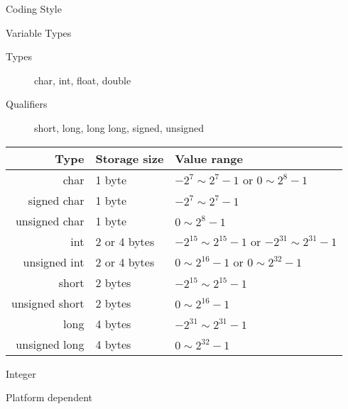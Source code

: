 \begin{frame}{Coding Style}
\begin{center}
\end{center}
\end{frame}

\begin{frame}{Variable Types}
  \begin{description}
  \item[Types] char, int, float, double
  \item[Qualifiers] short, long, long long, signed, unsigned
  \end{description}
  \begin{center}{\small
    \begin{tabular}{r|l|l}
      \textbf{Type} & \textbf{Storage size} & \textbf{Value range}\\\hline
      char          & 1 byte        & ${-2^7} \sim {2^7-1}$ or $0 \sim {2^8-1}$\\
      signed char   & 1 byte        & ${-2^7} \sim {2^7-1}$\\
      unsigned char & 1 byte        & $0 \sim {2^8-1}$\\
      int           & 2 or 4 bytes  & ${-2^{15}} \sim {2^{15}-1}$ or ${-2^{31}} \sim {2^{31}-1}$\\
      unsigned int  & 2 or 4 bytes  & $0 \sim {2^{16}-1}$ or $0 \sim {2^{32}-1}$\\
      short         & 2 bytes       & ${-2^{15}} \sim {2^{15}-1}$\\
      unsigned short& 2 bytes       & $0 \sim {2^{16}-1}$\\
      long          & 4 bytes       & ${-2^{31}} \sim {2^{31}-1}$\\
      unsigned long & 4 bytes       & $0 \sim {2^{32}-1}$
    \end{tabular}}
  \end{center}
\end{frame}

\begin{frame}{Integer}
  \begin{block}{Platform dependent}
    \begin{center}
    \end{center}
  \end{block}
\end{frame}

